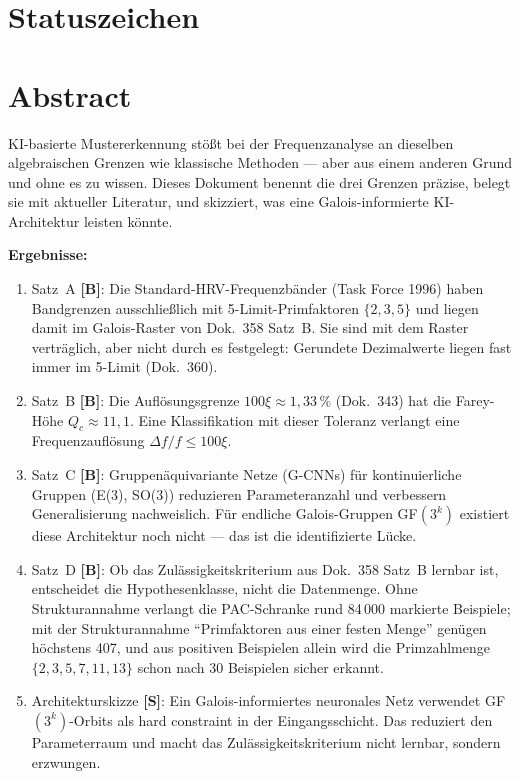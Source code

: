 \providecommand{\BM}{\textbf{[B]}}
\providecommand{\KM}{\textbf{[K]}}
\providecommand{\SM}{\textbf{[S]}}
\providecommand{\XM}{\textbf{[X]}}
\providecommand{\QM}{\textbf{[Q]}}
\providecommand{\EM}{\textbf{[E]}}
\providecommand{\LM}{\textbf{[L]}}

{}

\section*{Statuszeichen}


\section*{Abstract}

KI-basierte Mustererkennung stößt bei der Frequenzanalyse an dieselben
algebraischen Grenzen wie klassische Methoden --- aber aus einem anderen
Grund und ohne es zu wissen. Dieses Dokument benennt die drei Grenzen
präzise, belegt sie mit aktueller Literatur, und skizziert, was eine
Galois-informierte KI-Architektur leisten könnte.

\textbf{Ergebnisse:}
\begin{enumerate}
\item Satz~A \BM: Die Standard-HRV-Frequenzbänder (Task Force 1996) haben
  Bandgrenzen ausschließlich mit 5-Limit-Primfaktoren $\{2,3,5\}$ und
  liegen damit im Galois-Raster von Dok.~358 Satz~B. Sie sind mit dem
  Raster verträglich, aber nicht durch es festgelegt: Gerundete
  Dezimalwerte liegen fast immer im 5-Limit (Dok.~360).
\item Satz~B \BM: Die Auflösungsgrenze $100\xi\approx1{,}33\,\%$ (Dok.~343)
  hat die Farey-Höhe $Q_c\approx11{,}1$. Eine Klassifikation mit dieser
  Toleranz verlangt eine Frequenzauflösung $\Delta f/f\le100\xi$.
\item Satz~C \BM: Gruppenäquivariante Netze (G-CNNs) für kontinuierliche
  Gruppen (E(3), SO(3)) reduzieren Parameteranzahl und verbessern
  Generalisierung nachweislich. Für endliche Galois-Gruppen GF$(3^k)$
  existiert diese Architektur noch nicht --- das ist die identifizierte Lücke.
\item Satz~D \BM: Ob das Zulässigkeitskriterium aus Dok.~358 Satz~B
  lernbar ist, entscheidet die Hypothesenklasse, nicht die Datenmenge.
  Ohne Strukturannahme verlangt die PAC-Schranke rund 84\,000 markierte
  Beispiele; mit der Strukturannahme \enquote{Primfaktoren aus einer
  festen Menge} genügen höchstens 407, und aus positiven Beispielen allein
  wird die Primzahlmenge $\{2,3,5,7,11,13\}$ schon nach 30 Beispielen
  sicher erkannt.
\item Architekturskizze \SM: Ein Galois-informiertes neuronales Netz
  verwendet GF$(3^k)$-Orbits als hard constraint in der Eingangsschicht.
  Das reduziert den Parameterraum und macht das Zulässigkeitskriterium
  nicht lernbar, sondern erzwungen.
\end{enumerate}

